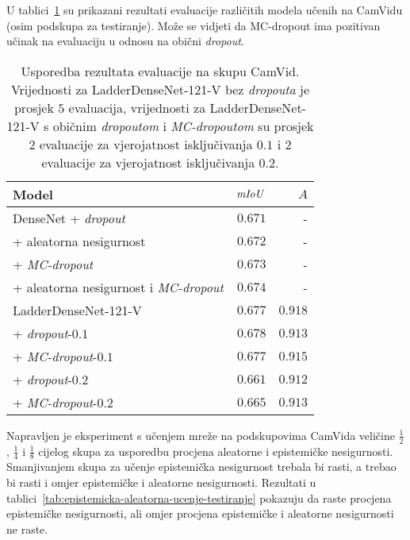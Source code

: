 \documentclass[utf8, diplomski, lmodern]{fer}
\begin{document}
U tablici~\ref{tab:evaluacija-camvid} su prikazani rezultati evaluacije različitih modela učenih na CamVidu (osim podskupa za testiranje). Može se vidjeti da MC-dropout ima pozitivan učinak na evaluaciju u odnosu na obični \textit{dropout}.

\begin{table}
	\centering\small
	\begin{tabular}{lrr}
		\toprule
		\bfseries Model & $\mathit{mIoU}$ & $A$ \\
		\midrule
		DenseNet + \textit{dropout} \citep{Kendall:2017:WUNBDLCV} & $0.671$ & - \\
		+ aleatorna nesigurnost & $0.672$ & - \\
		+ \textit{MC-dropout} & $0.673$ & -  \\
		+ aleatorna nesigurnost i \textit{MC-dropout} & $0.674$ & -\\
		\midrule
		LadderDenseNet-121-V & $0.677$ & $0.918$ \\
		+ \textit{dropout}-$0.1$ & $0.678$ & $0.913$ \\
		+ \textit{MC-dropout}-$0.1$ & $0.677$ & $0.915$ \\
		+ \textit{dropout}-$0.2$ & $0.661$ & $0.912$ \\
		+ \textit{MC-dropout}-$0.2$ & $0.665$ & $0.913$
		\\\bottomrule
	\end{tabular}
	\caption{Usporedba rezultata evaluacije na skupu CamVid. Vrijednosti za LadderDenseNet-121-V bez \textit{dropouta} je prosjek $5$ evaluacija, vrijednosti za LadderDenseNet-121-V s običnim \textit{dropoutom} i \textit{MC-dropoutom} su prosjek $2$ evaluacije za vjerojatnost isključivanja $0.1$ i $2$ evaluacije za vjerojatnost isključivanja $0.2$.}
	\label{tab:evaluacija-camvid}
\end{table}

Napravljen je eksperiment s učenjem mreže na podskupovima CamVida veličine $\frac{1}{2}$, $\frac{1}{4}$ i $\frac{1}{8}$ cijelog skupa za usporedbu procjena aleatorne i epistemičke nesigurnosti. Smanjivanjem skupa za učenje epistemička nesigurnost trebala bi rasti, a trebao bi rasti i omjer epistemičke i aleatorne nesigurnosti. Rezultati u tablici~\ref{tab:epistemicka-aleatorna-ucenje-testiranje} pokazuju da raste procjena epistemičke nesigurnosti, ali omjer procjena epistemičke i aleatorne nesigurnosti ne raste. 
\end{document}
